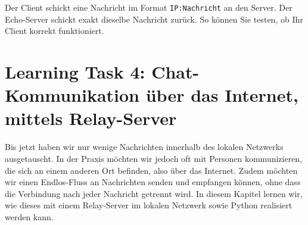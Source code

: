 \noindent
Der Client schickt eine Nachricht im Format \texttt{IP:Nachricht} an den Server. Der Echo-Server schickt exakt dieselbe Nachricht zurück. So können Sie testen, ob Ihr Client korrekt funktioniert.

\section{Learning Task 4: Chat-Kommunikation über das Internet, mittels Relay-Server}

Bis jetzt haben wir nur wenige Nachrichten innerhalb des lokalen Netzwerks ausgetauscht. In der Praxis möchten wir jedoch oft mit Personen kommunizieren, die sich an einem anderen Ort befinden, also über das Internet. Zudem möchten wir einen Endlos-Fluss an Nachrichten senden und empfangen können, ohne dass die Verbindung nach jeder Nachricht getrennt wird. In diesem Kapitel lernen wir, wie dieses mit einem Relay-Server im lokalen Netzwerk sowie Python realisiert werden kann.




